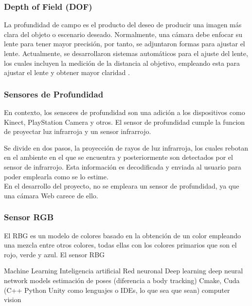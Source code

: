 \subsubsection{Depth of Field (DOF)}

La profundidad de campo es el producto del deseo de producir una imagen más clara del objeto o escenario deseado. Normalmente, una cámara debe enfocar su lente para tener mayor precisión, por tanto, se adjuntaron formas para ajustar el lente. Actualmente, se desarrollaron sistemas automáticos para el ajuste del lente, los cuales incluyen la medición de la distancia al objetivo, empleando esta para ajustar el lente y obtener mayor claridad \cite{madsen2000depth}. 

\subsubsection{Sensores de Profundidad} 

En contexto, los sensores de profundidad son una adición a los dispositivos como Kinect, PlayStation Camera y otros. El sensor de profundidad cumple la funcion de proyectar luz infrarroja y un sensor infrarrojo. 

Se divide en dos pasos, la proyección de rayos de luz infrarroja, los cuales rebotan en el ambiente en el que se encuentra y posteriormente son detectados por el sensor de infrarrojo. Esta información es decodificada y enviada al usuario para poder emplearla como se lo estime.
\\
En el desarrollo del proyecto, no se empleara un sensor de profundidad, ya que una cámara Web carece de ello.


\subsubsection{Sensor RGB}

El RBG es un modelo de colores basado en la obtención de un color empleando una mezcla entre otros colores, todas ellas con los colores primarios que son el rojo, verde y azul. 
El sensor RBG



Machine Learning
Inteligencia artificial
Red neuronal
Deep learning
deep neural network models
estimación de poses (diferencia a body tracking)
Cmake, Cuda
(C++ Python Unity como lenguajes o IDEs, lo que sea que sean)
computer vision











